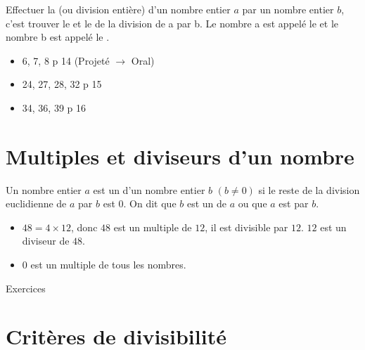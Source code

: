 \documentclass[12pt,a4paper]{article}
\begin{document}
\begin{mybilan}
	Effectuer la  (ou division entière) d’un nombre entier $a$ par un nombre entier $b$, c’est trouver le  et le  de la division de a par b.
	Le nombre a est appelé le  et le nombre b est appelé le .
	
\end{mybilan}

\begin{myexos}
	\begin{itemize}
		\item 6, 7, 8 p 14 (Projeté $\rightarrow$ Oral)
		\item 24, 27, 28, 32 p 15
		\item 34, 36, 39 p 16
	\end{itemize}
	
\end{myexos}

\section{Multiples et diviseurs d'un nombre}

\begin{mydef}
	Un nombre entier $a$ est un  d'un nombre entier $b$ $(b \neq 0)$ si le reste de la division euclidienne de $a$ par $b$ est $0$.
	On dit que $b$ est un  de $a$ ou que $a$ est  par $b$. 
\end{mydef}

\begin{myexs}
	\begin{itemize}
		\item $48 = 4 \times 12$, donc $48$ est un multiple de $12$, il est divisible par $12$. $12$ est un diviseur de $48$.
		
		\item 0 est un multiple de tous les nombres.
		
	\end{itemize}
\end{myexs}

\begin{myexos}
	Exercices 
\end{myexos}

\section{Critères de divisibilité}
\end{document}

